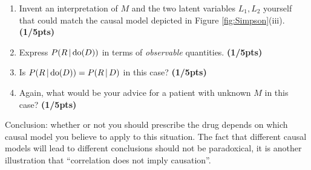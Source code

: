 \begin{enumerate}
\begin{enumerate}[resume*]
  \item Invent an interpretation of $M$ and the two latent variables $L_1,L_2$ yourself that could match the causal model depicted in Figure \ref{fig:Simpson}(iii).  \textbf{(1/5pts)}


\item Express $P(R \operatorname*{|} \text{do}(D))$ in terms of \emph{observable} quantities.  \textbf{(1/5pts)}


\item Is $P(R \operatorname*{|} \text{do}(D)) = P(R \operatorname*{|} D)$ in this case?  \textbf{(1/5pts)}


\item Again, what would be your advice for a patient with unknown $M$ in this case?  \textbf{(1/5pts)}

\end{enumerate}

Conclusion: whether or not you should prescribe the drug depends on which causal model you believe to apply to this situation. 
The fact that different causal models will lead to different conclusions should not be paradoxical, it is another illustration that
``correlation does not imply causation''.

 
\end{enumerate}

